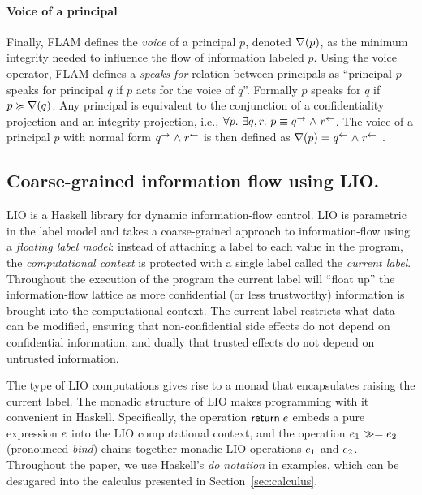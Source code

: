 \paragraph{Voice of a principal}
Finally, FLAM defines the \emph{voice} of a principal $p$, denoted $\nabla(p)$, as the minimum integrity needed to influence the flow of information labeled $p$. Using the voice operator, FLAM defines a \emph{speaks for} relation \cite{Lampson:1992:ADS:138873.138874, Abadi:2006:ACC:1159803.1159839} between principals as ``principal $p$ speaks for principal $q$ if $p$ acts for the voice of $q$''. Formally $p$ speaks for $q$ if $p \succcurlyeq \nabla(q)$. Any principal is equivalent to the conjunction of a confidentiality projection and an integrity projection, i.e., $\forall p.~ \exists q, r.~ p \equiv q^{\rightarrow} \mathrel{\land} r^{\leftarrow}$. The voice of a principal $p$ with normal form $q^{\rightarrow} \mathrel{\land} r^{\leftarrow}$ is then defined as $\nabla(p) = q^{\leftarrow} \mathrel{\land} r^{\leftarrow}$ \cite{Arden:2015:FA:2859845.2859998}.

\subsection{Coarse-grained information flow using LIO.}
LIO \cite{SRMMlio} is a Haskell library for dynamic information-flow control. LIO is parametric in the label model and takes a coarse-grained approach to information-flow using a \emph{floating label model}: instead of attaching a label to each value in the program, the \emph{computational context} is protected with a single label called the \emph{current label}. Throughout the execution of the program the current label will ``float up'' the information-flow lattice as more confidential (or less trustworthy) information is brought into the computational context. The current label restricts what data can be modified, ensuring that non-confidential side effects do not depend on confidential information, and dually that trusted effects do not depend on untrusted information.

The type of LIO computations gives rise to a monad \cite{Wadler:1995:MFP:647698.734146} that encapsulates raising the current label. The monadic structure of LIO makes programming with it convenient in Haskell. Specifically, the operation $\mathsf{return}\;e$ embeds a pure expression $e$ into the LIO computational context, and the operation $e_1 \gg= e_2$ (pronounced \emph{bind}) chains together monadic LIO operations $e_1$ and $e_2$. Throughout the paper, we use Haskell's \emph{do notation} in examples, which can be desugared into the calculus presented in Section~\ref{sec:calculus}.

